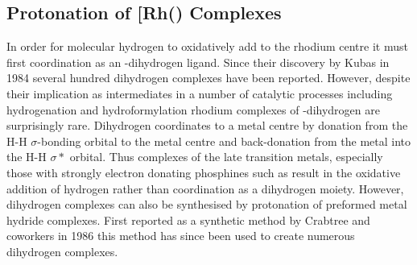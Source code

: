 

\subsection{Protonation of \texorpdfstring{[Rh(\tButhixantphos)\ce{Cl(H)2]}} R Complexes}

In order for molecular hydrogen to oxidatively add to the rhodium centre it must first coordination as an -dihydrogen ligand.  Since their discovery by Kubas in 1984\cite{Kubas1984} several hundred dihydrogen complexes have been reported.\cite{McGrady2003}  However, despite their implication as intermediates in a number of catalytic processes including hydrogenation and hydroformylation rhodium complexes of -dihydrogen are surprisingly rare.  Dihydrogen coordinates to a metal centre by donation from the H-H $\sigma$-bonding orbital to the metal centre and back-donation from the metal into the H-H $\sigma*$ orbital.  Thus complexes of the late transition metals, especially those with strongly electron donating phosphines such as \tBuxantphos{} result in the oxidative addition of hydrogen rather than coordination as a dihydrogen moiety.  However, dihydrogen complexes can also be synthesised by protonation of preformed metal hydride complexes.  First reported as a synthetic method by Crabtree and coworkers in 1986\cite{Crabtree1986} this method has since been used to create numerous dihydrogen complexes\cite{Janak2004, Oldham1997, Pons2004, Heinekey1993}.

